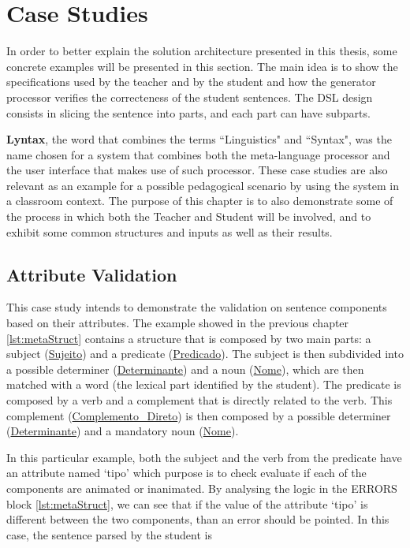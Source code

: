 \chapter{Case Studies} \label{case_study}
In order to better explain the solution architecture presented in this thesis, some concrete examples will be presented in this section. 
The main idea is to show the specifications used by the teacher and by the student and how the generator processor verifies the correcteness of the student sentences. 
The DSL design consists in slicing the sentence into parts, and each part can have subparts.

\textbf{Lyntax}, the word that combines the terms ``Linguistics" and ``Syntax", was the name chosen for a system that combines both the meta-language processor and
the user interface that makes use of such processor.
These case studies are also relevant as an example for a possible pedagogical scenario by using the system in a classroom context.
The purpose of this chapter is to also demonstrate some of the process in which both the Teacher and Student will be involved, and to exhibit some common structures
and inputs as well as their results.

\section{Attribute Validation}
This case study intends to demonstrate the validation on sentence components based on their attributes. The example showed in the previous chapter 
\autoref{lst:metaStruct} contains a structure that is composed by two main parts: a subject (\underline{Sujeito}) and a predicate (\underline{Predicado}). 
The subject is then subdivided into a possible determiner (\underline{Determinante}) and a noun (\underline{Nome}), which are then matched with a word 
(the lexical part identified by the student). The predicate is composed by a verb and a complement that is directly related to the verb. This complement 
(\underline{Complemento\_Direto}) is then composed by a possible determiner (\underline{Determinante}) and a mandatory noun (\underline{Nome}).

In this particular example, both the subject and the verb from the predicate have an attribute named ‘tipo’ which purpose is to check evaluate if each of the components
are animated or inanimated. By analysing the logic in the ERRORS block \autoref{lst:metaStruct}, we can see that if the value of the attribute ‘tipo’ is different 
between the two components, than an error should be pointed. In this case, the sentence parsed by the student is

